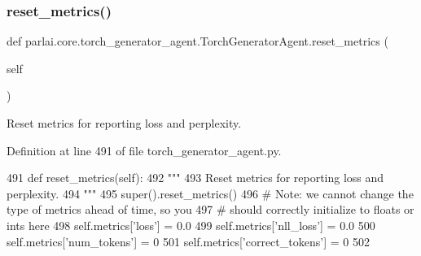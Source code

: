 \mbox{\label{classparlai_1_1core_1_1torch__generator__agent_1_1TorchGeneratorAgent_a7cac9c087d7357d32a7c3bc8fa74930c}} 
\subsubsection{\texorpdfstring{reset\+\_\+metrics()}{reset\_metrics()}}
{\footnotesize\ttfamily def parlai.\+core.\+torch\+\_\+generator\+\_\+agent.\+Torch\+Generator\+Agent.\+reset\+\_\+metrics (\begin{DoxyParamCaption}\item[{}]{self }\end{DoxyParamCaption})}

\begin{DoxyVerb}Reset metrics for reporting loss and perplexity.
\end{DoxyVerb}
 

Definition at line 491 of file torch\+\_\+generator\+\_\+agent.\+py.


\begin{DoxyCode}
491     \textcolor{keyword}{def }reset\_metrics(self):
492         \textcolor{stringliteral}{"""}
493 \textcolor{stringliteral}{        Reset metrics for reporting loss and perplexity.}
494 \textcolor{stringliteral}{        """}
495         super().reset\_metrics()
496         \textcolor{comment}{# Note: we cannot change the type of metrics ahead of time, so you}
497         \textcolor{comment}{# should correctly initialize to floats or ints here}
498         self.metrics[\textcolor{stringliteral}{'loss'}] = 0.0
499         self.metrics[\textcolor{stringliteral}{'nll\_loss'}] = 0.0
500         self.metrics[\textcolor{stringliteral}{'num\_tokens'}] = 0
501         self.metrics[\textcolor{stringliteral}{'correct\_tokens'}] = 0
502 
\end{DoxyCode}
\mbox{\label{classparlai_1_1core_1_1torch__generator__agent_1_1TorchGeneratorAgent_a8a3c13d2b8988d2a0cbb71f44ae81f52}} 
